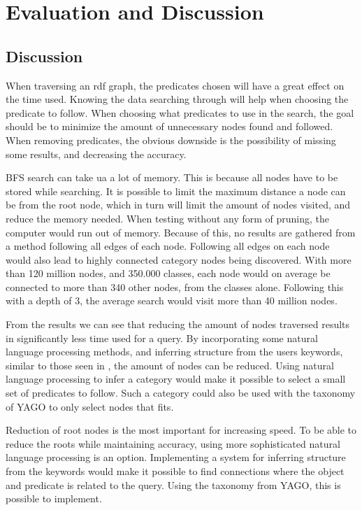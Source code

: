 \chapter{Evaluation and Discussion}
\label{cha:Discussion}

\section{Discussion}
\label{sec:Discussion}
When traversing an rdf graph, the predicates chosen will have a great effect on the time used. Knowing the data searching through will help when choosing the predicate to follow. When choosing what predicates to use in the search, the goal should be to minimize the amount of unnecessary nodes found and followed. When removing predicates, the obvious downside is the possibility of missing some results, and decreasing the accuracy.

BFS search can take ua a lot of memory. This is because all nodes have to be stored while searching. It is possible to limit the maximum distance a node can be from the root node, which in turn will limit the amount of nodes visited, and reduce the memory needed. When testing without any form of pruning, the computer would run out of memory. Because of this, no results are gathered from a method following all edges of each node. Following all edges on each node would also lead to highly connected category nodes being discovered. With more than 120 million nodes, and 350.000 classes, each node would on average be connected to more than 340 other nodes, from the classes alone. Following this with a depth of 3, the average search would visit more than 40 million nodes.

From the results we can see that reducing the amount of nodes traversed results in significantly less time used for a query. By incorporating some natural language processing methods, and inferring structure from the users keywords, similar to those seen in \cite{4812421, aqualog}, the amount of nodes can be reduced. Using natural language processing to infer a category would make it possible to select a small set of predicates to follow. Such a category could also be used with the taxonomy of YAGO to only select nodes that fits.

Reduction of root nodes is the most important for increasing speed. To be able to reduce the roots while maintaining accuracy, using more sophisticated natural language processing is an option. Implementing a system for inferring structure from the keywords would make it possible to find connections where the object and predicate is related to the query. Using the taxonomy from YAGO, this is possible to implement.

